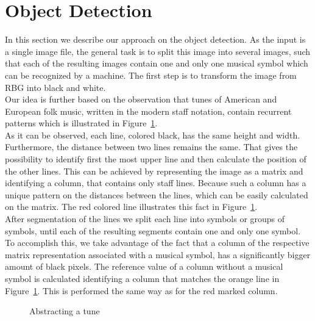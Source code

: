 \documentclass[twocolumn]{article}
\begin{document}
\section{Object Detection}
In this section we describe our approach on the object detection. As the input is a single image file, the general task is to split this image into several images, such that each of the resulting images contain one and only one musical symbol which can be recognized by a machine. The first step is to transform the image from RBG into black and white. \\
Our idea is further based on the observation that tunes of American and European folk music, written in the modern staff notation, contain recurrent patterns which is illustrated in Figure~\ref{object_detection}. \\
As it can be observed, each line, colored black, has the same height and width. Furthermore, the distance between two lines remains the same. That gives the possibility to identify first the most upper line and then calculate the position of the other lines. This can be achieved by representing the image as a matrix and identifying a column, that contains only staff lines. Because such a column has a unique pattern on the distances between the lines, which can be easily calculated on the matrix. The red colored line illustrates this fact in Figure~\ref{object_detection}. \\
After segmentation of the lines we split each line into symbols or groups of symbols, until each of the resulting segments contain one and only one symbol. To accomplish this, we take advantage of the fact that a column of the respective matrix representation associated with a musical symbol, has a significantly bigger amount of black pixels. The reference value of a column without a musical symbol is calculated identifying a column that matches the orange line in  Figure~\ref{object_detection}. This is performed the same way as for the red marked column. 

\begin{figure}
 
 \caption{Abstracting a tune} 
 \label{object_detection}
\end{figure}
\end{document}
